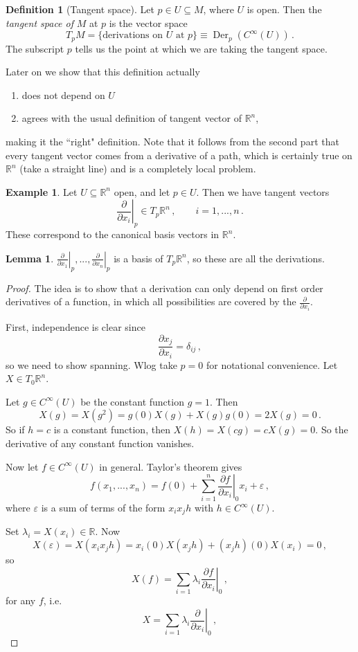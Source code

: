 \documentclass[a4paper,11pt]{article}
\theoremstyle{definition}
\newtheorem*{defn}{Definition}
\newtheorem*{ex}{Example}
\newtheorem*{lem}{Lemma}
\DeclareMathOperator{\Der}{Der}
\numberwithin{equation}{section}
\begin{document}
\begin{defn}[Tangent space]
Let $p\in U\subseteq M$, where $U$ is open. Then the \emph{tangent space of} $M$ at $p$ is the vector space
\[
T_pM=\{\text{derivations on }U\text{ at }p\}\equiv\Der_p(C^\infty(U))\,.
\]
The subscript $p$ tells us the point at which we are taking the tangent space.
\end{defn}

Later on we show that this definition actually
\begin{enumerate}
    \item does not depend on $U$
    \item agrees with the usual definition of tangent vector of $\mathbb{R}^n$,
\end{enumerate}
making it the ``right" definition. Note that it follows from the second part that every tangent vector comes from a derivative of a path, which is certainly true on $\mathbb{R}^n$ (take a straight line) and is a completely local problem.

\begin{ex}
Let $U\subseteq\mathbb{R}^n$ open, and let $p\in U$. Then we have tangent vectors 
\[
\left.\frac{\partial}{\partial x_i}\right|_p\in T_p\mathbb{R}^n\,,\qquad i=1,...,n\,.
\]
These correspond to the canonical basis vectors in $\mathbb{R}^n$.
\end{ex}

\begin{lem}
$\left.\frac{\partial}{\partial x_1}\right|_p,...,\left.\frac{\partial}{\partial x_n}\right|_p$ is a basis of $T_p\mathbb{R}^n$, so these are all the derivations.
\end{lem}

\begin{proof}
The idea is to show that a derivation can only depend on first order derivatives of a function, in which all possibilities are covered by the $\frac{\partial}{\partial x_i}$.

First, independence is clear since
\[
\frac{\partial x_j}{\partial x_i}=\delta_{ij}\,,
\]
so we need to show spanning. Wlog take $p=0$ for notational convenience. Let $X\in T_0\mathbb{R}^n$.

Let $g\in C^\infty(U)$ be the constant function $g=1$. Then
\[
X(g)=X(g^2)=g(0)X(g)+X(g)g(0)=2X(g)=0\,.
\]
So if $h=c$ is a constant function, then $X(h)=X(cg)=cX(g)=0$. So the derivative of any constant function vanishes.

Now let $f\in C^\infty(U)$ in general. Taylor's theorem gives
\[
f(x_1,...,x_n)=f(0)+\sum_{i=1}^n\left.\frac{\partial f}{\partial x_i}\right|_0x_i+\varepsilon\,,
\]
where $\varepsilon$ is a sum of terms of the form $x_ix_jh$ with $h\in C^\infty(U)$.

Set $\lambda_i=X(x_i)\in\mathbb{R}$. Now
\[
X(\varepsilon)=X(x_ix_jh)=x_i(0)X(x_jh)+(x_jh)(0)X(x_i)=0\,,
\]
so 
\[
X(f)=\sum_{i=1}\lambda_i\left.\frac{\partial f}{\partial x_i}\right|_0\,,
\]
for any $f$, i.e.
\[
X=\sum_{i=1}\lambda_i\left.\frac{\partial}{\partial x_i}\right|_0\,,
\]
\end{proof}
\end{document}
